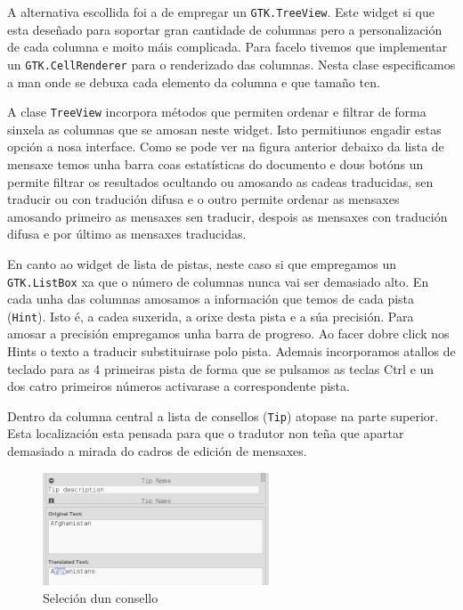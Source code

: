 A alternativa escollida foi a de empregar un \lstinline{GTK.TreeView}. Este widget si que esta deseñado para soportar gran cantidade de columnas pero a personalización de cada columna e moito máis complicada. Para facelo tivemos que implementar un \lstinline{GTK.CellRenderer} para o renderizado das columnas. Nesta clase especificamos a man onde se debuxa cada elemento da columna e que tamaño ten.

A clase \lstinline{TreeView} incorpora métodos que permiten ordenar e filtrar de forma sinxela as columnas que se amosan neste widget. Isto permitiunos engadir estas opción a nosa interface. Como se pode ver na figura anterior debaixo da lista de mensaxe temos unha barra coas estatísticas do documento e dous botóns un permite filtrar os resultados ocultando ou amosando as cadeas traducidas, sen traducir ou con tradución difusa e o outro permite ordenar as mensaxes amosando primeiro as mensaxes sen traducir, despois as mensaxes con tradución difusa e por último as mensaxes traducidas.

En canto ao widget de lista de pistas, neste caso si que empregamos un \lstinline{GTK.ListBox} xa que o número de columnas nunca vai ser demasiado alto. En cada unha das columnas amosamos a información que temos de cada pista (\lstinline{Hint}). Isto é, a cadea suxerida, a orixe desta pista e a súa precisión. Para amosar a precisión empregamos unha barra de progreso. Ao facer dobre click nos Hints o texto a traducir substituirase polo pista. Ademais incorporamos atallos de teclado para as 4 primeiras pista de forma que se pulsamos as teclas Ctrl e un dos catro primeiros números activarase a correspondente pista.

Dentro da columna central a lista de consellos (\lstinline{Tip}) atopase na parte superior. Esta localización esta pensada para que o tradutor non teña que apartar demasiado a mirada do cadros de edición de mensaxes.

\begin{figure}[h!]
    \centering
    \includegraphics[width=0.6\textwidth]{img/selectedtip.png}
    \caption{Seleción dun consello}
    \label{fig:ui:panel:edit:selectedtip}
\end{figure}

